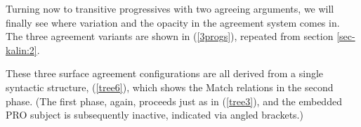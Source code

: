 \documentclass[output=paper
,modfonts
,nonflat]{langsci/langscibook}
\begin{document}
Turning now to transitive progressives with two agreeing arguments, we will finally see where variation and the opacity in the agreement system comes in. The three agreement variants are shown in (\ref{3progs}), repeated from section \ref{sec-kalin:2}. 

\eal \label{3progs}
\zl
These three surface agreement configurations are all derived from a single syntactic structure, (\ref{tree6}), which shows the Match relations in the second phase. (The first phase, again, proceeds just as in (\ref{tree3}), and the embedded PRO subject is subsequently inactive, indicated via angled brackets.) 
\end{document}
